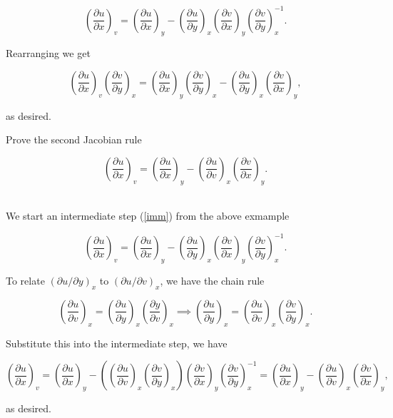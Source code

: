 \documentclass[english,a4paper,12pt]{report}
\begin{document}
{\begin{equation}
	\left( \frac{\partial u}{\partial x}  \right)_{v} = \left( \frac{\partial u}{\partial x}  \right)_{y} - \left( \frac{\partial u}{\partial y}  \right)_{x} \left( \frac{\partial v}{\partial x}  \right)_{y} \left( \frac{\partial v}{\partial y}  \right)^{-1} _{x}. \label{imm} 
\end{equation}

Rearranging we get

\begin{equation}
	\left( \frac{\partial u}{\partial x}  \right)_{v} \left( \frac{\partial v}{\partial y}  \right)_{x} = \left( \frac{\partial u}{\partial x}  \right)_{y} \left( \frac{\partial v}{\partial y}  \right)_{x} - \left( \frac{\partial u}{\partial y}  \right)_{x} \left( \frac{\partial v}{\partial x}  \right)_{y},      
\end{equation}

as desired.
} 

{Prove the second Jacobian rule

\begin{equation}
	\left( \frac{\partial u}{\partial x}  \right)_{v} = \left( \frac{\partial u}{\partial x}  \right)_{y} - \left( \frac{\partial u}{\partial v}  \right)_{x} \left( \frac{\partial v}{\partial x}  \right)_{y}.    
\end{equation}
~
}
{We start an intermediate step (\cref{imm}) from the above exmample

\begin{equation}
	\left( \frac{\partial u}{\partial x}  \right)_{v} = \left( \frac{\partial u}{\partial x}  \right)_{y} - \left( \frac{\partial u}{\partial y}  \right)_{x} \left( \frac{\partial v}{\partial x}  \right)_{y} \left( \frac{\partial v}{\partial y}  \right)^{-1} _{x}.
\end{equation}

To relate \(\left( \partial u /\partial y \right)_{x} \) to \(\left( \partial u/\partial v \right)_{x} \), we have the chain rule

\begin{equation}
	\left( \frac{\partial u}{\partial v} \right)_{x} = \left( \frac{\partial u}{\partial y} \right)_{x} \left( \frac{\partial y}{\partial v} \right)_{x} \implies \left( \frac{\partial u}{\partial y} \right)_{x} = \left( \frac{\partial u}{\partial v} \right)_{x} \left( \frac{\partial v}{\partial y} \right)_{x}.
\end{equation}

Substitute this into the intermediate step, we have

\begin{equation}
	\left( \frac{\partial u}{\partial x} \right)_{v} = \left( \frac{\partial u}{\partial x} \right)_{y} - \left( \left( \frac{\partial u}{\partial v} \right)_{x} \left( \frac{\partial v}{\partial y} \right)_{x}  \right) \left( \frac{\partial v}{\partial x} \right)_{y} \left( \frac{\partial v}{\partial y} \right)_{x} ^{-1} = \left( \frac{\partial u}{\partial x} \right)_{y} - \left( \frac{\partial u}{\partial v} \right)_{x} \left( \frac{\partial v}{\partial x} \right)_{y},
\end{equation}

as desired.
}
\end{document}

